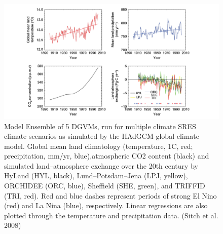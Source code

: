 \documentclass[12pt,oneside]{book}
\begin{document}
\begin{figure}

{\centering \includegraphics[width=0.8\linewidth]{figures/chap10/f10_8_Sitch_ensemble} 

}

\caption{Model Ensemble of 5 DGVMs, run for multiple climate SRES climate scenarios as simulated by the HAdGCM global climate model. Global mean land climatology (temperature, 1C, red; precipitation, mm/yr, blue),atmospheric CO2 content (black) and simulated land–atmosphere exchange over the 20th century by HyLand (HYL, black), Lund–Potsdam–Jena (LPJ, yellow), ORCHIDEE (ORC, blue), Sheffield (SHE, green), and TRIFFID (TRI, red). Red and blue dashes represent periods of strong El Nino (red) and La Nina (blue), respectively. Linear regressions are also plotted through the temperature and precipitation data. (Sitch et al. 2008) }\label{fig:f108}
\end{figure}
\end{document}
